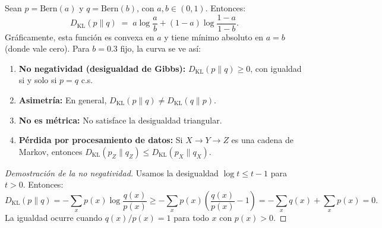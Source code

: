 \begin{example}
	Sean $p = \mathrm{Bern}(a)$ y $q = \mathrm{Bern}(b)$, con $a,b \in (0,1)$.  Entonces:
	\[
	D_{\mathrm{KL}}(p \| q) \;=\; a \log \frac{a}{b} + (1-a) \log \frac{1-a}{1-b}.
	\]
	Gráficamente, esta función es convexa en $a$ y tiene mínimo absoluto en $a = b$ (donde vale cero).  Para $b = 0.3$ fijo, la curva se ve así:

	\begin{center}
	\end{center}
\end{example}

\begin{proposition}
	\begin{enumerate}
		\item \textbf{No negatividad (desigualdad de Gibbs):} $D_{\mathrm{KL}}(p \| q) \ge 0$, con igualdad si y solo si $p = q$ c.s.
		\item \textbf{Asimetría:} En general, $D_{\mathrm{KL}}(p \| q) \ne D_{\mathrm{KL}}(q \| p)$.
		\item \textbf{No es métrica:} No satisface la desigualdad triangular.
		\item \textbf{Pérdida por procesamiento de datos:} Si $X \to Y \to Z$ es una cadena de Markov, entonces $D_{\mathrm{KL}}(p_Z \| q_Z) \le D_{\mathrm{KL}}(p_X \| q_X)$.
	\end{enumerate}
\end{proposition}

\begin{proof}[Demostración de la no negatividad]
	Usamos la desigualdad $\log t \le t - 1$ para $t > 0$.  Entonces:
	\[
	D_{\mathrm{KL}}(p \| q) = -\sum_x p(x) \log \frac{q(x)}{p(x)} \ge -\sum_x p(x)\left(\frac{q(x)}{p(x)} - 1\right) = -\sum_x q(x) + \sum_x p(x) = 0.
	\]
	La igualdad ocurre cuando $q(x)/p(x) = 1$ para todo $x$ con $p(x) > 0$.
\end{proof}

